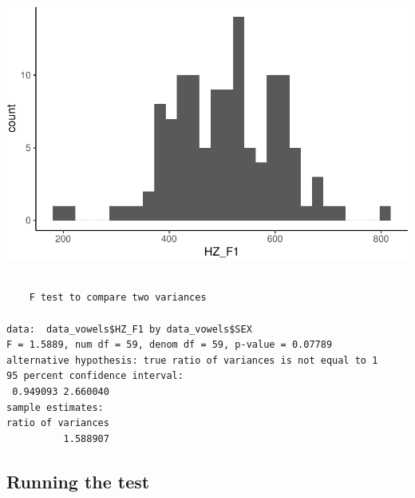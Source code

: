 \documentclass[
  11pt,
  letterpaper,
  DIV=11,
  numbers=noendperiod]{scrreprt}
\newenvironment{Shaded}{\begin{snugshade}}{\end{snugshade}}
\newcommand{\AttributeTok}[1]{\textcolor[rgb]{0.40,0.45,0.13}{#1}}
\newcommand{\CommentTok}[1]{\textcolor[rgb]{0.37,0.37,0.37}{#1}}
\newcommand{\ConstantTok}[1]{\textcolor[rgb]{0.56,0.35,0.01}{#1}}
\newcommand{\FunctionTok}[1]{\textcolor[rgb]{0.28,0.35,0.67}{#1}}
\newcommand{\NormalTok}[1]{\textcolor[rgb]{0.00,0.23,0.31}{#1}}
\newcommand{\SpecialCharTok}[1]{\textcolor[rgb]{0.37,0.37,0.37}{#1}}
\begin{document}
\includegraphics{t_test_files/figure-pdf/unnamed-chunk-8-1.pdf}

\begin{Shaded}
\end{Shaded}

\begin{verbatim}

    F test to compare two variances

data:  data_vowels$HZ_F1 by data_vowels$SEX
F = 1.5889, num df = 59, denom df = 59, p-value = 0.07789
alternative hypothesis: true ratio of variances is not equal to 1
95 percent confidence interval:
 0.949093 2.660040
sample estimates:
ratio of variances 
          1.588907 
\end{verbatim}

\subsection{Running the test}\label{running-the-test-1}

\begin{Shaded}
\end{Shaded}
\end{document}
